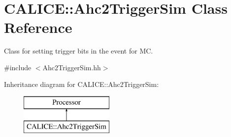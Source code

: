 \section{C\-A\-L\-I\-C\-E\-:\-:Ahc2\-Trigger\-Sim Class Reference}
\label{classCALICE_1_1Ahc2TriggerSim}


Class for setting trigger bits in the event for M\-C.  




{\ttfamily \#include $<$Ahc2\-Trigger\-Sim.\-hh$>$}

Inheritance diagram for C\-A\-L\-I\-C\-E\-:\-:Ahc2\-Trigger\-Sim\-:\begin{figure}[H]
\begin{center}
\leavevmode
\includegraphics[height=2.000000cm]{classCALICE_1_1Ahc2TriggerSim}
\end{center}
\end{figure}
